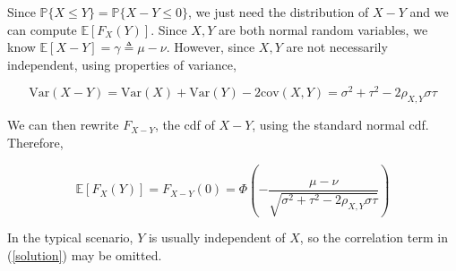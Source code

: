 \documentclass{article}
\numberwithin{equation}{section}
\begin{document}
Since $ \mathbb{P}\{X \le Y\} = \mathbb{P}\{X - Y \le 0\} $, we just need the
distribution of $ X - Y $ and we can compute $ \mathbb{E}[F_X(Y)] $. Since
$ X, Y $ are both normal random variables, we know
$ \mathbb{E}[X - Y] = \gamma \triangleq \mu - \nu $. However, since $ X, Y $ are
not necessarily independent, using properties of
variance\footnotemark{},

\begin{equation*}
    \mathrm{Var}(X - Y) = \mathrm{Var}(X) + \mathrm{Var}(Y) -
        2\mathrm{cov}(X, Y) =
    \sigma^2 + \tau^2 - 2\rho_{X, Y}\sigma\tau
\end{equation*}

We can then rewrite $ F_{X - Y} $, the cdf of $ X - Y $, using the standard
normal cdf. Therefore,

\begin{equation} \label{solution}
    \mathbb{E}[F_X(Y)] = F_{X - Y}(0) =
    \Phi\left(-\frac{\mu - \nu}{
        \sqrt{\sigma^2 + \tau^2 - 2\rho_{X, Y}\sigma\tau}
    }\right)
\end{equation}

In the typical scenario, $ Y $ is usually independent of $ X $, so the
correlation term in (\ref{solution}) may be omitted.
\end{document}
